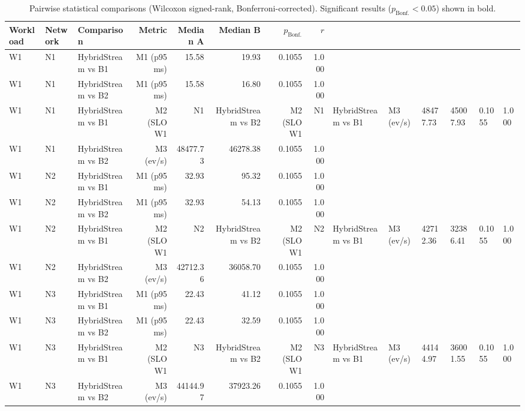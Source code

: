 \begin{table}[htbp]
\centering
\caption{Pairwise statistical comparisons (Wilcoxon signed-rank, Bonferroni-corrected). Significant results ($p_{\text{Bonf.}} < 0.05$) shown in bold.}
\label{tab:statistical_comparisons}
\small
\begin{tabular}{lllrrrrr}
\toprule
Workload & Network & Comparison & Metric & Median A & Median B & $p_{\text{Bonf.}}$ & $r$ \\
\midrule
W1 & N1 & HybridStream vs B1 & M1 (p95 ms) & 15.58 & 19.93 & 0.1055 & 1.000 \\
W1 & N1 & HybridStream vs B2 & M1 (p95 ms) & 15.58 & 16.80 & 0.1055 & 1.000 \\
W1 & N1 & HybridStream vs B1 & M2 (SLO %
W1 & N1 & HybridStream vs B2 & M2 (SLO %
W1 & N1 & HybridStream vs B1 & M3 (ev/s) & 48477.73 & 45007.93 & 0.1055 & 1.000 \\
W1 & N1 & HybridStream vs B2 & M3 (ev/s) & 48477.73 & 46278.38 & 0.1055 & 1.000 \\
W1 & N2 & HybridStream vs B1 & M1 (p95 ms) & 32.93 & 95.32 & 0.1055 & 1.000 \\
W1 & N2 & HybridStream vs B2 & M1 (p95 ms) & 32.93 & 54.13 & 0.1055 & 1.000 \\
W1 & N2 & HybridStream vs B1 & M2 (SLO %
W1 & N2 & HybridStream vs B2 & M2 (SLO %
W1 & N2 & HybridStream vs B1 & M3 (ev/s) & 42712.36 & 32386.41 & 0.1055 & 1.000 \\
W1 & N2 & HybridStream vs B2 & M3 (ev/s) & 42712.36 & 36058.70 & 0.1055 & 1.000 \\
W1 & N3 & HybridStream vs B1 & M1 (p95 ms) & 22.43 & 41.12 & 0.1055 & 1.000 \\
W1 & N3 & HybridStream vs B2 & M1 (p95 ms) & 22.43 & 32.59 & 0.1055 & 1.000 \\
W1 & N3 & HybridStream vs B1 & M2 (SLO %
W1 & N3 & HybridStream vs B2 & M2 (SLO %
W1 & N3 & HybridStream vs B1 & M3 (ev/s) & 44144.97 & 36001.55 & 0.1055 & 1.000 \\
W1 & N3 & HybridStream vs B2 & M3 (ev/s) & 44144.97 & 37923.26 & 0.1055 & 1.000 \\

\end{tabular}
\end{table}

